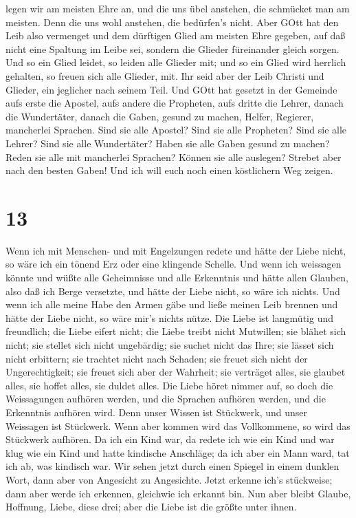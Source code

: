legen wir am meisten Ehre an, und die uns übel anstehen, die schmücket
man am meisten.  Denn die uns wohl anstehen, die bedürfen's
nicht. Aber GOtt hat den Leib also vermenget und dem dürftigen Glied am
meisten Ehre gegeben,  auf daß nicht eine Spaltung im Leibe
sei, sondern die Glieder füreinander gleich sorgen.  Und so
ein Glied leidet, so leiden alle Glieder mit; und so ein Glied wird
herrlich gehalten, so freuen sich alle Glieder, mit.  Ihr
seid aber der Leib Christi und Glieder, ein jeglicher nach seinem Teil.
 Und GOtt hat gesetzt in der Gemeinde aufs erste die
Apostel, aufs andere die Propheten, aufs dritte die Lehrer, danach die
Wundertäter, danach die Gaben, gesund zu machen, Helfer, Regierer,
mancherlei Sprachen.  Sind sie alle Apostel? Sind sie alle
Propheten? Sind sie alle Lehrer? Sind sie alle Wundertäter?
 Haben sie alle Gaben gesund zu machen? Reden sie alle mit
mancherlei Sprachen? Können sie alle auslegen?  Strebet
aber nach den besten Gaben! Und ich will euch noch einen köstlichern Weg
zeigen.

\hypertarget{section-12}{%
\section{13}\label{section-12}}

 Wenn ich mit Menschen- und mit Engelzungen redete und hätte
der Liebe nicht, so wäre ich ein tönend Erz oder eine klingende Schelle.
 Und wenn ich weissagen könnte und wüßte alle Geheimnisse
und alle Erkenntnis und hätte allen Glauben, also daß ich Berge
versetzte, und hätte der Liebe nicht, so wäre ich nichts. 
Und wenn ich alle meine Habe den Armen gäbe und ließe meinen Leib
brennen und hätte der Liebe nicht, so wäre mir's nichts nütze.
 Die Liebe ist langmütig und freundlich; die Liebe eifert
nicht; die Liebe treibt nicht Mutwillen; sie blähet sich nicht;
 sie stellet sich nicht ungebärdig; sie suchet nicht das
Ihre; sie lässet sich nicht erbittern; sie trachtet nicht nach Schaden;
 sie freuet sich nicht der Ungerechtigkeit; sie freuet sich
aber der Wahrheit;  sie verträget alles, sie glaubet alles,
sie hoffet alles, sie duldet alles.  Die Liebe höret nimmer
auf, so doch die Weissagungen aufhören werden, und die Sprachen aufhören
werden, und die Erkenntnis aufhören wird.  Denn unser Wissen
ist Stückwerk, und unser Weissagen ist Stückwerk.  Wenn
aber kommen wird das Vollkommene, so wird das Stückwerk aufhören.
 Da ich ein Kind war, da redete ich wie ein Kind und war
klug wie ein Kind und hatte kindische Anschläge; da ich aber ein Mann
ward, tat ich ab, was kindisch war.  Wir sehen jetzt durch
einen Spiegel in einem dunklen Wort, dann aber von Angesicht zu
Angesichte. Jetzt erkenne ich's stückweise; dann aber werde ich
erkennen, gleichwie ich erkannt bin.  Nun aber bleibt
Glaube, Hoffnung, Liebe, diese drei; aber die Liebe ist die größte unter
ihnen.


